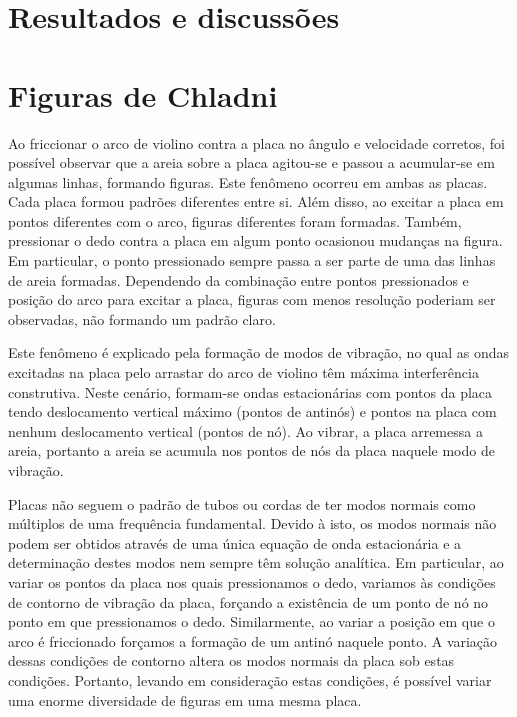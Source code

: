 \section{Resultados e discussões}
\section{Figuras de Chladni}

Ao friccionar o arco de violino contra a placa no ângulo e velocidade corretos, foi possível observar que a areia sobre a placa agitou-se e passou a acumular-se em algumas linhas, formando figuras. Este fenômeno ocorreu em ambas as placas. Cada placa formou padrões diferentes entre si. Além disso, ao excitar a placa em pontos diferentes com o arco, figuras diferentes foram formadas. Também, pressionar o dedo contra a placa em algum ponto ocasionou mudanças na figura. Em particular, o ponto pressionado sempre passa a ser parte de uma das linhas de areia formadas. Dependendo da combinação entre pontos pressionados e posição do arco para excitar a placa, figuras com menos resolução poderiam ser observadas, não formando um padrão claro.

Este fenômeno é explicado pela formação de modos de vibração, no qual as ondas excitadas na placa pelo arrastar do arco de violino têm máxima interferência construtiva. Neste cenário, formam-se ondas estacionárias com pontos da placa tendo deslocamento vertical máximo (pontos de antinós) e pontos na placa com nenhum deslocamento vertical (pontos de nó). Ao vibrar, a placa arremessa a areia, portanto a areia se acumula nos pontos de nós da placa naquele modo de vibração. 

Placas não seguem o padrão de tubos ou cordas de ter modos normais como múltiplos de uma frequência fundamental. Devido à isto, os modos normais não podem ser obtidos através de uma única equação de onda estacionária e a determinação destes modos nem sempre têm solução analítica. Em particular, ao variar os pontos da placa nos quais pressionamos o dedo, variamos às condições de contorno de vibração da placa, forçando a existência de um ponto de nó no ponto em que pressionamos o dedo. Similarmente, ao variar a posição em que o arco é friccionado forçamos a formação de um antinó naquele ponto. A variação dessas condições de contorno altera os modos normais da placa sob estas condições. Portanto, levando em consideração estas condições, é possível variar uma enorme diversidade de figuras em uma mesma placa. 

